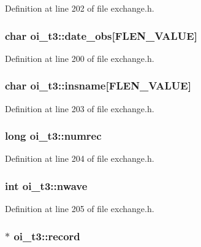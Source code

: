 Definition at line 202 of file exchange.h.

\hypertarget{structoi__t3_a27af7378e096d383e46e283eba0e6204}{
\subsubsection[{date\_\-obs}]{\setlength{\rightskip}{0pt plus 5cm}char {\bf oi\_\-t3::date\_\-obs}\mbox{[}FLEN\_\-VALUE\mbox{]}}}
\label{structoi__t3_a27af7378e096d383e46e283eba0e6204}


Definition at line 200 of file exchange.h.

\hypertarget{structoi__t3_af2db7713353420b4b50cef80cbf9a2ad}{
\subsubsection[{insname}]{\setlength{\rightskip}{0pt plus 5cm}char {\bf oi\_\-t3::insname}\mbox{[}FLEN\_\-VALUE\mbox{]}}}
\label{structoi__t3_af2db7713353420b4b50cef80cbf9a2ad}


Definition at line 203 of file exchange.h.

\hypertarget{structoi__t3_a73fa1367bf5eea5a275b91936863218c}{
\subsubsection[{numrec}]{\setlength{\rightskip}{0pt plus 5cm}long {\bf oi\_\-t3::numrec}}}
\label{structoi__t3_a73fa1367bf5eea5a275b91936863218c}


Definition at line 204 of file exchange.h.

\hypertarget{structoi__t3_aa93f9e594f282e81b4adaea9ac9771f7}{
\subsubsection[{nwave}]{\setlength{\rightskip}{0pt plus 5cm}int {\bf oi\_\-t3::nwave}}}
\label{structoi__t3_aa93f9e594f282e81b4adaea9ac9771f7}


Definition at line 205 of file exchange.h.

\hypertarget{structoi__t3_a359365283adb0116ce519fe412c0433a}{
\subsubsection[{record}]{$\ast$ {\bf oi\_\-t3::record}}}
\label{structoi__t3_a359365283adb0116ce519fe412c0433a}


